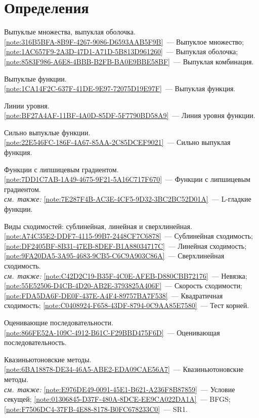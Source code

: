 \section*{Определения}\label{app:bilety:def}
\begin{description}[font=\normalfont\bfseries]
\item[О1.] Выпуклые множества, выпуклая оболочка.\\
  \cref{note:316B5BFA-8B9F-4267-9086-D6593AAB5F9B}~--- Выпуклое множество;\\
  \cref{note:1AC657F9-2A3D-47D1-A71D-5B813D961260}~--- Выпуклая оболочка;\\
  \cref{note:8583F986-A6E8-4BBB-B2FB-BA0E9BBE58BF}~--- Выпуклая комбинация.
\item[О2.] Выпуклые функции.\\
  \cref{note:1CA14F2C-637F-41DE-9E97-72075D19E97F}~--- Выпуклая функция.
\item[О3.] Линии уровня.\\
  \cref{note:BF27A4AF-11BF-4A0D-85DF-5F7790BD58A9}~--- Линия уровня функции.
\item[О4.] Сильно выпуклые функции.\\
  \cref{note:22E546FC-186F-4A67-85AA-2C85DCEF9021}~--- Сильно выпуклая функция.
\item[О5.] Функции с липшицевым градиентом.\\
  \cref{note:7DD1C7AB-1A49-4675-9F21-5A16C717F670}~--- Функции с липшицевым градиентом.\\
  \emph{см.\ также:} \cref{note:7E287F4B-AC3E-4CF5-9D32-3BC2BC52D01A}~--- L-гладкие функции.
\item[О6.] Виды сходимостей: сублинейная, линейная и сверхлинейная.\\
  \cref{note:A74C35E2-DDF7-4115-99B7-2448CF7C6878}~--- Сублинейная сходимость;\\
  \cref{note:DF2405BF-8B31-47EB-8DEF-B1A88034717C}~--- Линейная сходимость;\\
  \cref{note:9FA20DA5-3A95-4683-9CB5-C6C9A903C86A}~--- Сверхлинейная сходимость.\\
  \emph{см.\ также:} \cref{note:C42D2C19-B35F-4C0E-AFEB-D880CBB72176}~--- Невязка; \cref{note:55E52506-D4CB-4D20-AB2E-3793825A406F}~--- Скорость сходимости; \cref{note:FDA5DA6F-DE0F-437E-A4F4-89757BA7F538}~--- Квадратичная сходимость; \cref{note:C0408924-F658-43DF-8794-0C9AA85E7580}~--- Тест корней.
\item[О7.] Оценивающие последовательности.\\
  \cref{note:866FE52A-109C-4912-B61C-F29BBD475F6D}~--- Оценивающая последовательность.
\item[О8.] Квазиньютоновские методы.\\
  \cref{note:6BA18878-DE34-46A5-ABE2-EDA09CAE56A7}~--- Квазиньютоновские методы.\\
  \emph{см.\ также:} \cref{note:E976DE49-0091-45E1-B621-A236F8B87859}~--- Условие секущей; \cref{note:01306845-D37F-480A-8DCE-EE9CA022DA1A}~--- BFGS; \cref{note:F7506DC4-37FB-4E88-8178-B0FC678233C0}~--- SR1.
\end{description}
\endgroup
